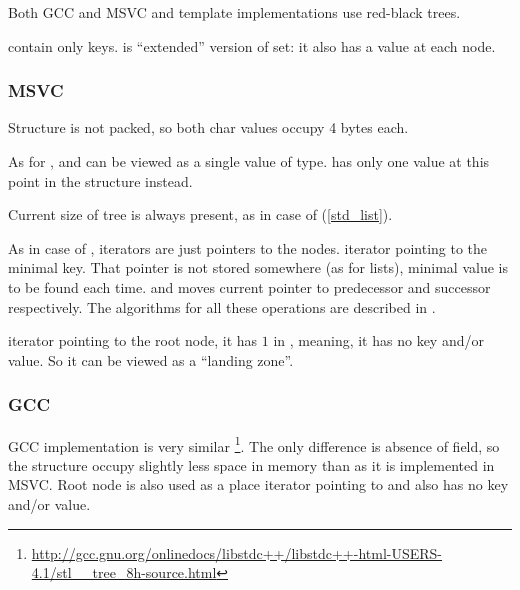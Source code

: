 Both GCC and MSVC  and  template implementations use red-black trees.

 contain only keys.
 is ``extended'' version of set: it also has a value at each node.

\subsubsection{MSVC}





Structure is not packed, so both char values occupy 4 bytes each.

As for ,  and  can be viewed as a single value of  type.
 has only one value at this point in the structure instead.

Current size of tree is always present, as in case of  (\ref{std_list}).

As in case of , iterators are just pointers to the nodes.
 iterator pointing to the minimal key.
That pointer is not stored somewhere (as for lists), minimal value is to be found each time.
 and  moves current pointer to predecessor and successor respectively.
The algorithms for all these operations are described in \cite{Cormen:2009:IAT:1614191}.

 iterator pointing to the root node, it has $1$ in , meaning, it has no key and/or value.
So it can be viewed as a ``landing zone''.

\subsubsection{GCC}





GCC implementation is very similar
\footnote{\url{http://gcc.gnu.org/onlinedocs/libstdc++/libstdc++-html-USERS-4.1/stl__tree_8h-source.html}}.
The only difference is absence of  field,
so the structure occupy slightly less space in memory than as it is implemented in MSVC.
Root node is also used as a place  iterator pointing to and also has no key and/or value.

